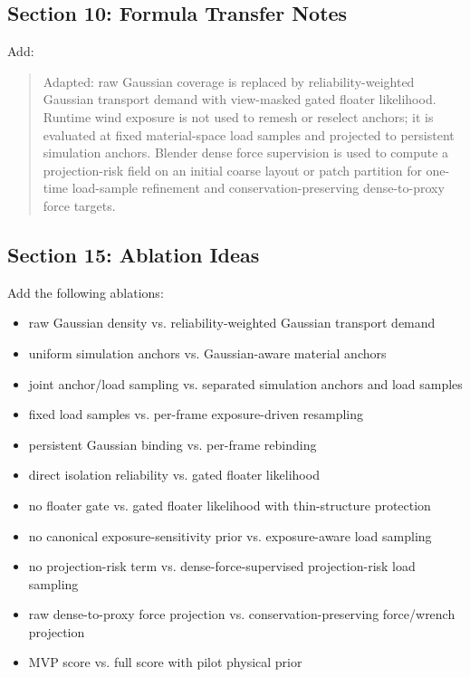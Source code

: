 \documentclass[11pt,a4paper]{article}
\begin{document}
\subsection{Section 10: Formula Transfer Notes}

Add:

\begin{quote}
Adapted: raw Gaussian coverage is replaced by reliability-weighted Gaussian transport demand with view-masked gated floater likelihood. Runtime wind exposure is not used to remesh or reselect anchors; it is evaluated at fixed material-space load samples and projected to persistent simulation anchors. Blender dense force supervision is used to compute a projection-risk field on an initial coarse layout or patch partition for one-time load-sample refinement and conservation-preserving dense-to-proxy force targets.
\end{quote}

\subsection{Section 15: Ablation Ideas}

Add the following ablations:

\begin{itemize}[leftmargin=2em]
\item raw Gaussian density vs. reliability-weighted Gaussian transport demand
\item uniform simulation anchors vs. Gaussian-aware material anchors
\item joint anchor/load sampling vs. separated simulation anchors and load samples
\item fixed load samples vs. per-frame exposure-driven resampling
\item persistent Gaussian binding vs. per-frame rebinding
\item direct isolation reliability vs. gated floater likelihood
\item no floater gate vs. gated floater likelihood with thin-structure protection
\item no canonical exposure-sensitivity prior vs. exposure-aware load sampling
\item no projection-risk term vs. dense-force-supervised projection-risk load sampling
\item raw dense-to-proxy force projection vs. conservation-preserving force/wrench projection
\item MVP score vs. full score with pilot physical prior
\end{itemize}
\end{document}
